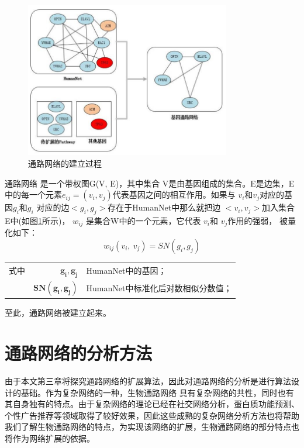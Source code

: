 \begin{figure}
\centering
\includegraphics[width = 0.8\textwidth]{pathway_cons}
\caption[fig21]{通路网络的建立过程}
\label{fig21}
\end{figure}
通路网络 是一个带权图G(V, E)，其中集合 V是由基因组成的集合。E是边集，E中的每一个元素$e_{ij}=(v_{i}, v_{j})$代表基因之间的相互作用。如果与 $v_{i}$和$v_{j}$对应的基因$g_{i}$和$g_{i}$ 对应的边$< g_{i} ,g_{j}  >$存在于HumanNet中那么就把边 $< v_{i} ,v_{j}  >$加入集合E中(如图\ref{fig21}所示)， $w_{ij}$ 是集合W中的一个元素，它代表 $v_{i}$和 $v_{j}$作用的强弱， 被量化如下：
\begin{equation}\label{eq22}
w_{ij} ( v_{i} ,\ v_{j}) =SN( g_{i} ,g_{j})
\end{equation}
\begin{tabularx}{\textwidth}{@{}l@{\quad}r@{———}X@{}}
式中 & $\boldsymbol{ g_{i}, g_{j}}$ &HumanNet中的基因；\\
	& $\boldsymbol{SN( g_{i} ,g_{j})}$ & HumanNet中标准化后对数相似分数值；\\
\end{tabularx}\vspace{3.15bp}
至此，通路网络被建立起来。


\section{ 通路网络的分析方法}
由于本文第三章将探究通路网络的扩展算法，因此对通路网络的分析是进行算法设计的基础。作为复杂网络的一种，生物通路网络
具有复杂网络的共性，同时也有其自身独有的特点。由于复杂网络的理论已经在社交网络分析，蛋白质功能预测、个性广告推荐等领域取得了较好效果，因此这些成熟的复杂网络分析方法也将帮助我们了解生物通路网络的特点，为实现该网络的扩展，生物通路网络的部分特点也将作为网络扩展的依据。

